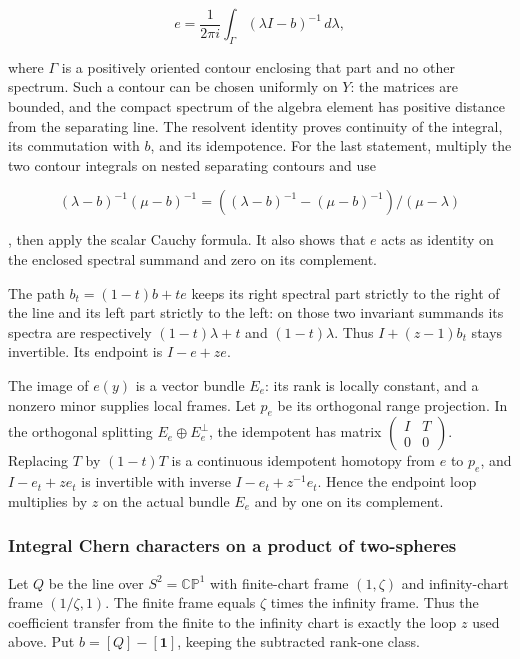 \begin{equation}
e=\frac1{2\pi i}\int_\Gamma(\lambda I-b)^{-1}\,d\lambda,
\label{courseIII:almost-complex-structures-and-integrability:eq:10.5}
\end{equation}

where \(\Gamma\) is a positively oriented contour enclosing that part and no other spectrum. Such a contour can be chosen uniformly on \(Y\): the matrices are bounded, and the compact spectrum of the algebra element has positive distance from the separating line. The resolvent identity proves continuity of the integral, its commutation with \(b\), and its idempotence. For the last statement, multiply the two contour integrals on nested separating contours and use

\[
(\lambda-b)^{-1}(\mu-b)^{-1}=((\lambda-b)^{-1}-(\mu-b)^{-1})/(\mu-\lambda)
\]

,
then apply the scalar Cauchy formula. It also shows that \(e\) acts as identity on the enclosed spectral summand and zero on its complement.

The path \(b_t=(1-t)b+te\) keeps its right spectral part strictly to the right of the line and its left part strictly to the left: on those two invariant summands its spectra are respectively \((1-t)\lambda+t\) and \((1-t)\lambda\). Thus \(I+(z-1)b_t\) stays invertible. Its endpoint is \(I-e+ze\).

The image of \(e(y)\) is a vector bundle \(E_e\): its rank is locally constant, and a nonzero minor supplies local frames. Let \(p_e\) be its orthogonal range projection. In the orthogonal splitting \(E_e\oplus E_e^\perp\), the idempotent has matrix \(\begin{pmatrix}I&T\\0&0\end{pmatrix}\). Replacing \(T\) by \((1-t)T\) is a continuous idempotent homotopy from \(e\) to \(p_e\), and \(I-e_t+ze_t\) is invertible with inverse \(I-e_t+z^{-1}e_t\). Hence the endpoint loop multiplies by \(z\) on the actual bundle \(E_e\) and by one on its complement.

\subsubsection{Integral Chern characters on a product of two-spheres}
\label{courseIII:almost-complex-structures-and-integrability:section-10.3}

Let \(Q\) be the line over \(S^2=\mathbb{CP}^1\) with finite-chart frame \((1,\zeta)\) and infinity-chart frame \((1/\zeta,1)\). The finite frame equals \(\zeta\) times the infinity frame. Thus the coefficient transfer from the finite to the infinity chart is exactly the loop \(z\) used above. Put \(b=[Q]-[\mathbf1]\), keeping the subtracted rank-one class.

